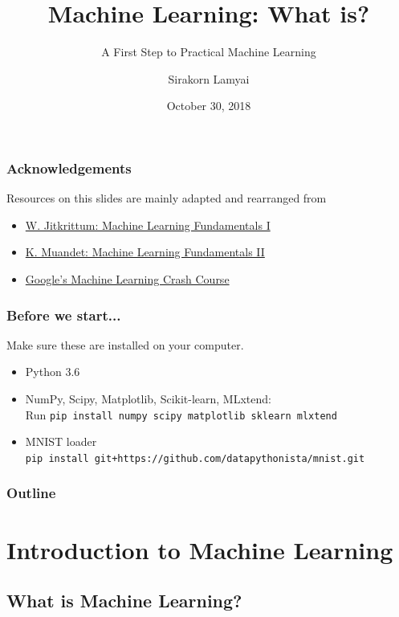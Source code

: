 \documentclass[aspectratio=169]{beamer}
\title{Machine Learning: What is?}
\subtitle{A First Step to Practical Machine Learning}
\author{Sirakorn Lamyai}
\institute{Student, Kasetsart U.}
\date{October 30, 2018}
\begin{document}
\begin{frame}
	\titlepage
\end{frame}

\begin{frame}
	\frametitle{Acknowledgements}
	Resources on this slides are mainly adapted and rearranged from
	\begin{itemize}
		\item \href{https://docs.google.com/presentation/d/1oGIyzoMHT3-TTS23NPL-qzh0EAXb6kyK0S_1n5MjmgQ/edit\#slide=id.p}{W. Jitkrittum: Machine Learning Fundamentals I}
		\item \href{http://krikamol.org/tutorial/slides/vistec-talk-16-March-2018.pdf}{K. Muandet: Machine Learning Fundamentals II}
		\item \href{}{Google's Machine Learning Crash Course}
	\end{itemize}
\end{frame}

\begin{frame}
	\frametitle{Before we start...}
	Make sure these are installed on your computer.\\

	\begin{itemize}
		\item Python 3.6
		\item NumPy, Scipy, Matplotlib, Scikit-learn, MLxtend:\\
			  Run \texttt{pip install numpy scipy matplotlib sklearn mlxtend}
		\item MNIST loader\\
			  \texttt{pip install git+https://github.com/datapythonista/mnist.git}
	\end{itemize}
\end{frame}

\begin{frame}
	\frametitle{Outline}
	\begin{multicols}{2}
		\tableofcontents
	\end{multicols}
\end{frame}

\section{Introduction to Machine Learning}

\subsection{What is Machine Learning?}
\end{document}
